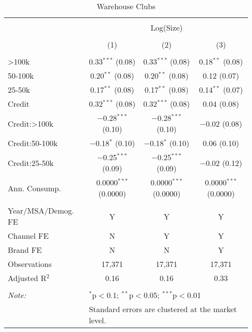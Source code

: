 
\begin{table}[!htbp] \centering 
  \caption{Warehouse Clubs} 
  \label{tab:packageSizeWarehouseSoda} 
\begin{tabular}{@{\extracolsep{5pt}}lccc} 
\\[-1.8ex]\hline 
\hline \\[-1.8ex] 
 & \multicolumn{3}{c}{Log(Size)} \\ 
\\[-1.8ex] & (1) & (2) & (3)\\ 
\hline \\[-1.8ex] 
 >100k & 0.33$^{***}$ (0.08) & 0.33$^{***}$ (0.08) & 0.18$^{**}$ (0.08) \\ 
  50-100k & 0.20$^{**}$ (0.08) & 0.20$^{**}$ (0.08) & 0.12 (0.07) \\ 
  25-50k & 0.17$^{**}$ (0.08) & 0.17$^{**}$ (0.08) & 0.14$^{**}$ (0.07) \\ 
  Credit & 0.32$^{***}$ (0.08) & 0.32$^{***}$ (0.08) & 0.04 (0.08) \\ 
  Credit:>100k & $-$0.28$^{***}$ (0.10) & $-$0.28$^{***}$ (0.10) & $-$0.02 (0.08) \\ 
  Credit:50-100k & $-$0.18$^{*}$ (0.10) & $-$0.18$^{*}$ (0.10) & 0.06 (0.10) \\ 
  Credit:25-50k & $-$0.25$^{***}$ (0.09) & $-$0.25$^{***}$ (0.09) & $-$0.02 (0.12) \\ 
  Ann. Consump. & 0.0000$^{***}$ (0.0000) & 0.0000$^{***}$ (0.0000) & 0.0000$^{***}$ (0.0000) \\ 
 \hline \\[-1.8ex] 
Year/MSA/Demog. FE & Y & Y & Y \\ 
Channel FE & N & Y & Y \\ 
Brand FE & N & N & Y \\ 
Observations & 17,371 & 17,371 & 17,371 \\ 
Adjusted R$^{2}$ & 0.16 & 0.16 & 0.33 \\ 
\hline 
\hline \\[-1.8ex] 
\textit{Note:}  & \multicolumn{3}{l}{$^{*}$p$<$0.1; $^{**}$p$<$0.05; $^{***}$p$<$0.01} \\ 
 & \multicolumn{3}{l}{Standard errors are clustered at the market level.} \\ 
\end{tabular} 
\end{table} 
